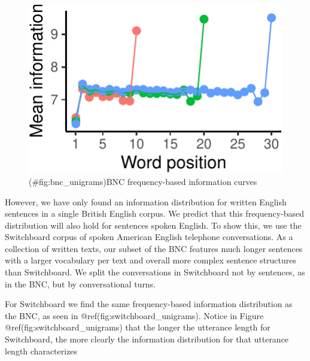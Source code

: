 \documentclass[man,floatsintext]{apa6}
\begin{document}
\begin{figure}
\centering
\includegraphics{figs/bnc_unigrams-1.pdf}
\caption{(\#fig:bnc\_unigrams)BNC frequency-based information curves}
\end{figure}

However, we have only found an information distribution for written English sentences in a single British English corpus. We predict that this frequency-based distribution will also hold for sentences spoken English. To show this, we use the Switchboard corpus of spoken American English telephone conversations. As a collection of written texts, our subset of the BNC features much longer sentences with a larger vocabulary per text and overall more complex sentence structures than Switchboard. We split the conversations in Switchboard not by sentences, as in the BNC, but by conversational turns.

For Switchboard we find the same frequency-based information distribution as the BNC, as seen in @ref(fig:switchboard\_unigrams). Notice in Figure @ref(fig:switchboard\_unigrams) that the longer the utterance length for Switchboard, the more clearly the information distribution for that utterance length characterizes
\end{document}
